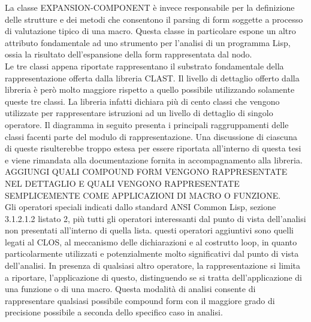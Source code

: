 La classe EXPANSION-COMPONENT è invece responsabile per la definizione delle
strutture e dei metodi che consentono il parsing di form soggette a processo
di valutazione tipico di una macro. Questa classe in particolare espone un
altro attributo fondamentale ad uno strumento per l’analisi di un programma
Lisp, ossia la risultato dell’espansione della form rappresentata dal nodo.\\

Le tre classi appena riportate rappresentano il substrato fondamentale della
rappresentazione offerta dalla libreria CLAST. Il livello di dettaglio offerto
dalla libreria è però molto maggiore rispetto a quello possibile utilizzando
solamente queste tre classi. La libreria infatti dichiara più di cento classi
che vengono utilizzate per rappresentare istruzioni ad un livello di dettaglio
di singolo operatore. Il diagramma in seguito presenta i principali
raggruppamenti delle classi facenti parte del modulo di rappresentazione. Una
discussione di ciascuna di queste risulterebbe troppo estesa per essere
riportata all’interno di questa tesi e viene rimandata alla documentazione
fornita in accompagnamento alla libreria.\\

AGGIUNGI QUALI COMPOUND FORM VENGONO RAPPRESENTATE NEL DETTAGLIO E QUALI
VENGONO RAPPRESENTATE SEMPLICEMENTE COME APPLICAZIONI DI MACRO O FUNZIONE.\\

Gli operatori speciali indicati dallo standard ANSI Common Lisp, sezione
3.1.2.1.2 listato 2, più tutti gli operatori interessanti dal punto di vista
dell’analisi non presentati all’interno di quella lista. questi operatori
aggiuntivi sono quelli legati al CLOS, al meccanismo delle dichiarazioni e al
costrutto loop, in quanto particolarmente utilizzati e potenzialmente molto
significativi dal punto di vista dell’analisi. In presenza di qualsiasi altro
operatore, la rappresentazione si limita a riportare, l’applicazione di
questo, distinguendo se si tratta dell’applicazione di una funzione o di una
macro. Questa modalità di analisi consente di rappresentare qualsiasi
possibile compound form con il maggiore grado di precisione possibile a
seconda dello specifico caso in analisi.
